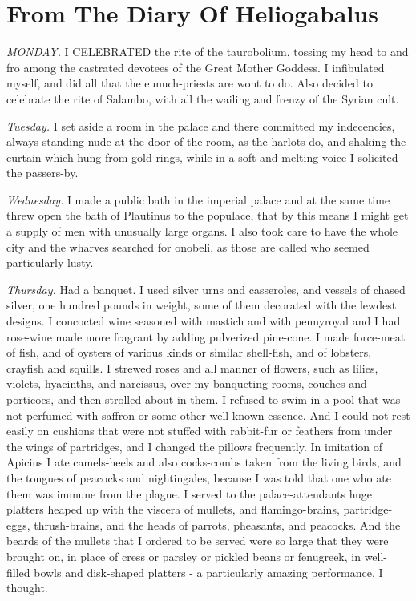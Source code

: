 \chapter{From The Diary Of Heliogabalus}

\emph{MONDAY.} I CELEBRATED the rite of the taurobolium, tossing my head to and fro among the castrated devotees of the Great Mother Goddess. I infibulated myself, and did all that the eunuch-priests are wont to do. Also decided to celebrate the rite of Salambo, with all the wailing and frenzy of the Syrian cult.

\emph{Tuesday.} I set aside a room in the palace and there committed my indecencies, always standing nude at the door of the room, as the harlots do, and shaking the curtain which hung from gold rings, while in a soft and melting voice I solicited the passers-by.

\emph{Wednesday.} I made a public bath in the imperial palace and at the same time threw open the bath of Plautinus to the populace, that by this means I might get a supply of men with unusually large organs. I also took care to have the whole city and the wharves searched for onobeli, as those are called who seemed particularly lusty.

\emph{Thursday.} Had a banquet. I used silver urns and casseroles, and vessels of chased silver, one hundred pounds in weight, some of them decorated with the lewdest designs. I concocted wine seasoned with mastich and with pennyroyal and I had rose-wine made more fragrant by adding pulverized pine-cone. I made force-meat of fish, and of oysters of various kinds or similar shell-fish, and of lobsters, crayfish and squills. I strewed roses and all manner of flowers, such as lilies, violets, hyacinths, and narcissus, over my banqueting-rooms, couches and porticoes, and then strolled about in them. I refused to swim in a pool that was not perfumed with saffron or some other well-known essence. And I could not rest easily on cushions that were not stuffed with rabbit-fur or feathers from under the wings of partridges, and I changed the pillows frequently. In imitation of Apicius I ate camels-heels and also cocks-combs taken from the living birds, and the tongues of peacocks and nightingales, because I was told that one who ate them was immune from the plague. I served to the palace-attendants huge platters heaped up with the viscera of mullets, and flamingo-brains, partridge-eggs, thrush-brains, and the heads of parrots, pheasants, and peacocks. And the beards of the mullets that I ordered to be served were so large that they were brought on, in place of cress or parsley or pickled beans or fenugreek, in well-filled bowls and disk-shaped platters - a particularly amazing performance, I thought.

